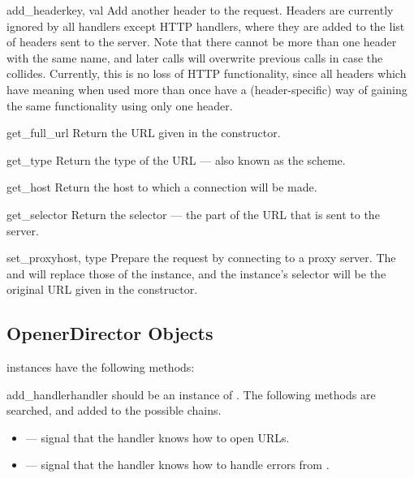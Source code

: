 \begin{methoddesc}[Request]{add_header}{key, val}
Add another header to the request.  Headers are currently ignored by
all handlers except HTTP handlers, where they are added to the list
of headers sent to the server.  Note that there cannot be more than
one header with the same name, and later calls will overwrite
previous calls in case the  collides.  Currently, this is
no loss of HTTP functionality, since all headers which have meaning
when used more than once have a (header-specific) way of gaining the
same functionality using only one header.
\end{methoddesc}

\begin{methoddesc}[Request]{get_full_url}{}
Return the URL given in the constructor.
\end{methoddesc}

\begin{methoddesc}[Request]{get_type}{}
Return the type of the URL --- also known as the scheme.
\end{methoddesc}

\begin{methoddesc}[Request]{get_host}{}
Return the host to which a connection will be made.
\end{methoddesc}

\begin{methoddesc}[Request]{get_selector}{}
Return the selector --- the part of the URL that is sent to
the server.
\end{methoddesc}

\begin{methoddesc}[Request]{set_proxy}{host, type}
Prepare the request by connecting to a proxy server. The 
and  will replace those of the instance, and the instance's
selector will be the original URL given in the constructor.
\end{methoddesc}


\subsection{OpenerDirector Objects \label{opener-director-objects}}

 instances have the following methods:

\begin{methoddesc}[OpenerDirector]{add_handler}{handler}
 should be an instance of .  The
following methods are searched, and added to the possible chains.

\begin{itemize}
  \item {} ---
    signal that the handler knows how to open  URLs.
  \item {} ---
    signal that the handler knows how to handle  errors from
    .
\end{itemize}
\end{methoddesc}

